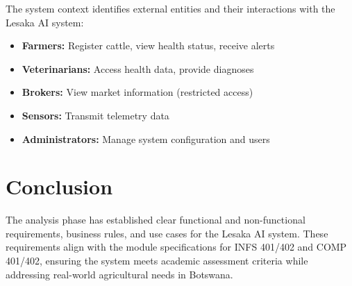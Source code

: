 The system context identifies external entities and their interactions with the Lesaka AI system:

\begin{itemize}
    \item \textbf{Farmers:} Register cattle, view health status, receive alerts
    \item \textbf{Veterinarians:} Access health data, provide diagnoses
    \item \textbf{Brokers:} View market information (restricted access)
    \item \textbf{Sensors:} Transmit telemetry data
    \item \textbf{Administrators:} Manage system configuration and users
\end{itemize}

\section{Conclusion}

The analysis phase has established clear functional and non-functional requirements, business rules, and use cases for the Lesaka AI system. These requirements align with the module specifications for INFS 401/402 and COMP 401/402, ensuring the system meets academic assessment criteria while addressing real-world agricultural needs in Botswana.
